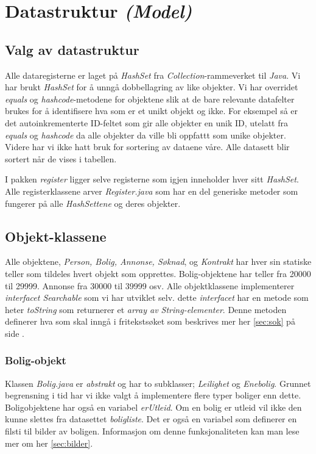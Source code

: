 \section{Datastruktur \emph{(Model)}} \label{sec:Datastruktur}

\subsection{Valg av datastruktur}
Alle dataregisterne er laget på \emph{HashSet} fra \emph{Collection}-rammeverket til \emph{Java}. Vi har brukt \emph{HashSet} for å unngå dobbellagring av like objekter. Vi har overridet \emph{equals} og \emph{hashcode}-metodene for objektene slik at de bare relevante datafelter brukes for å identifisere hva som er et unikt objekt og ikke. For eksempel så er det autoinkrementerte ID-feltet som gir alle objekter en unik ID, utelatt fra \emph{equals} og \emph{hashcode} da alle objekter da ville bli oppfattt som unike objekter.
Videre har vi ikke hatt bruk for sortering av dataene våre. Alle datasett blir sortert når de vises i tabellen.

I pakken \emph{register} ligger selve registerne som igjen inneholder hver sitt \emph{HashSet}. Alle registerklassene arver \emph{Register.java} som har en del generiske metoder som fungerer på alle \emph{HashSettene} og deres objekter.

\subsection{Objekt-klassene}
Alle objektene, \emph{Person, Bolig, Annonse, Søknad}, og \emph{Kontrakt} har hver sin statiske teller som tildeles hvert objekt som opprettes. Bolig-objektene har teller fra 20000 til 29999. Annonse fra 30000 til 39999 osv.
Alle objektklassene implementerer \emph{interfacet Searchable} som vi har utviklet selv. dette \emph{interfacet} har en metode som heter \emph{toString} som returnerer et \emph{array av String-elementer}. Denne metoden definerer hva som skal inngå i fritekstsøket som beskrives mer her \ref{sec:sok} på side \pageref{sec:sok}.

\subsubsection{Bolig-objekt}
Klassen \emph{Bolig.java} er \emph{abstrakt} og har to subklasser; \emph{Leilighet} og \emph{Enebolig}. Grunnet begrensning i tid har vi ikke valgt å implementere flere typer boliger enn dette.
Boligobjektene har også en variabel \emph{erUtleid}. Om en bolig er utleid vil ikke den kunne slettes fra datasettet \emph{boligliste}.
Det er også en variabel som definerer en filsti til bilder av boligen. Informasjon om denne funksjonaliteten kan man lese mer om her \ref{sec:bilder}.

